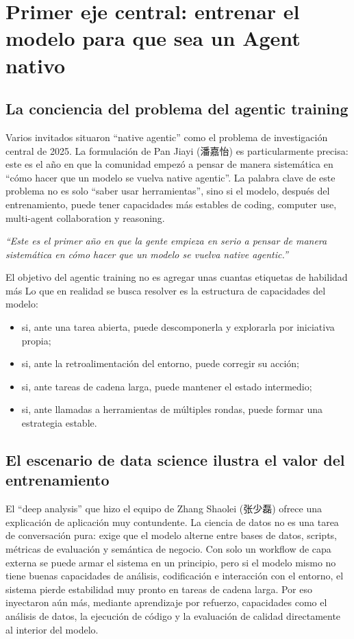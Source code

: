\section{Primer eje central: entrenar el modelo para que sea un Agent nativo}

\subsection{La conciencia del problema del agentic training}

Varios invitados situaron ``native agentic'' como el problema de investigación central de 2025. La formulación de Pan Jiayi (潘嘉怡) es particularmente precisa: este es el año en que la comunidad empezó a pensar de manera sistemática en ``cómo hacer que un modelo se vuelva native agentic''. La palabra clave de este problema no es solo ``saber usar herramientas'', sino si el modelo, después del entrenamiento, puede tener capacidades más estables de coding, computer use, multi-agent collaboration y reasoning.

\textit{``Este es el primer año en que la gente empieza en serio a pensar de manera sistemática en cómo hacer que un modelo se vuelva native agentic.''}

\begin{importantbox}{El objetivo del agentic training no es agregar unas cuantas etiquetas de habilidad más}
Lo que en realidad se busca resolver es la estructura de capacidades del modelo:
\begin{itemize}
  \item si, ante una tarea abierta, puede descomponerla y explorarla por iniciativa propia;
  \item si, ante la retroalimentación del entorno, puede corregir su acción;
  \item si, ante tareas de cadena larga, puede mantener el estado intermedio;
  \item si, ante llamadas a herramientas de múltiples rondas, puede formar una estrategia estable.
\end{itemize}
\end{importantbox}

\subsection{El escenario de data science ilustra el valor del entrenamiento}

El ``deep analysis'' que hizo el equipo de Zhang Shaolei (张少磊) ofrece una explicación de aplicación muy contundente. La ciencia de datos no es una tarea de conversación pura: exige que el modelo alterne entre bases de datos, scripts, métricas de evaluación y semántica de negocio. Con solo un workflow de capa externa se puede armar el sistema en un principio, pero si el modelo mismo no tiene buenas capacidades de análisis, codificación e interacción con el entorno, el sistema pierde estabilidad muy pronto en tareas de cadena larga. Por eso inyectaron aún más, mediante aprendizaje por refuerzo, capacidades como el análisis de datos, la ejecución de código y la evaluación de calidad directamente al interior del modelo.

